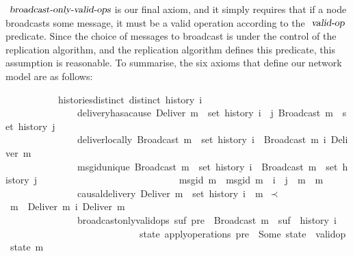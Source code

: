$\isa{broadcast-only-valid-ops}$ is our final axiom, and it simply requires that if a node broadcasts some message, it must be a valid operation according to the $\isa{valid-op}$ predicate.
Since the choice of messages to broadcast is under the control of the replication algorithm, and the replication algorithm defines this predicate, this assumption is reasonable.
To summarise, the six axioms that define our network model are as follows:
\vspace{0.375em}
\begin{isabellebody}
\ \ \ \ \ \ \ \ \ \ \ histories{\isacharunderscore}distinct{\isacharcolon}\ {\isachardoublequoteopen}distinct\ {\isacharparenleft}history\ i{\isacharparenright}{\isachardoublequoteclose}\isanewline
\ \ \ \ \ \ \ \ \ \ \ \ \ \ \ delivery{\isacharunderscore}has{\isacharunderscore}a{\isacharunderscore}cause{\isacharcolon}\ {\isachardoublequoteopen}Deliver\ m\ {\isasymin}\ set\ {\isacharparenleft}history\ i{\isacharparenright}\ {\isasymLongrightarrow}\ {\isasymexists}j{\isachardot}\ Broadcast\ m\ {\isasymin}\ set\ {\isacharparenleft}history\ j{\isacharparenright}{\isachardoublequoteclose}\isanewline
\ \ \ \ \ \ \ \ \ \ \ \ \ \ \ deliver{\isacharunderscore}locally{\isacharcolon}\ {\isachardoublequoteopen}Broadcast\ m\ {\isasymin}\ set\ {\isacharparenleft}history\ i{\isacharparenright}\ {\isasymLongrightarrow}\ Broadcast\ m\ {\isasymsqsubset}\isactrlsup i\ Deliver\ m{\isachardoublequoteclose}\isanewline
\ \ \ \ \ \ \ \ \ \ \ \ \ \ \ msg{\isacharunderscore}id{\isacharunderscore}unique{\isacharcolon}\ {\isachardoublequoteopen}Broadcast\ m{}\ {\isasymin}\ set\ {\isacharparenleft}history\ i{\isacharparenright}\ {\isasymLongrightarrow}\ Broadcast\ m{}\ {\isasymin}\ set\ {\isacharparenleft}history\ j{\isacharparenright}\ {\isasymLongrightarrow}\isanewline
\ \ \ \ \ \ \ \ \ \ \ \ \ \ \ \ \ \ \ \ \ \ \ \ \ \ \ \ msg{\isacharunderscore}id\ m{}\ {\isacharequal}\ msg{\isacharunderscore}id\ m{}\ {\isasymLongrightarrow}\ i\ {\isacharequal}\ j\ {\isasymand}\ m{}\ {\isacharequal}\ m{}{\isachardoublequoteclose}\isanewline
\ \ \ \ \ \ \ \ \ \ \ \ \ \ \ causal{\isacharunderscore}delivery{\isacharcolon}\ {\isachardoublequoteopen}Deliver\ m{}\ {\isasymin}\ set\ {\isacharparenleft}history\ i{\isacharparenright}\ {\isasymLongrightarrow}\ m{}\ $\prec$\ m{}\ {\isasymLongrightarrow}\ Deliver\ m{}\ {\isasymsqsubset}\isactrlsup i\ Deliver\ m{}{\isachardoublequoteclose}\isanewline
\ \ \ \ \ \ \ \ \ \ \ \ \ \ \ broadcast{\isacharunderscore}only{\isacharunderscore}valid{\isacharunderscore}ops{\isacharcolon}\ {\isachardoublequoteopen}{\isasymexists}suf{\isachardot}\ pre\ {\isacharat}\ {\isacharbrackleft}Broadcast\ m{\isacharbrackright}\ {\isacharat}\ suf\ {\isacharequal}\ history\ i \ {\isasymLongrightarrow}\isanewline
\ \ \ \ \ \ \ \ \ \ \ \ \ \ \ \ \ \ \ \ \ \ \ \ \ \ \ \ {\isasymexists}state{\isachardot}\ apply{\isacharunderscore}operations\ pre\ {\isacharequal}\ Some\ state\ {\isasymand}\ valid{\isacharunderscore}op\ state\ m{\isachardoublequoteclose}
\end{isabellebody}
\vspace{0.375em}
